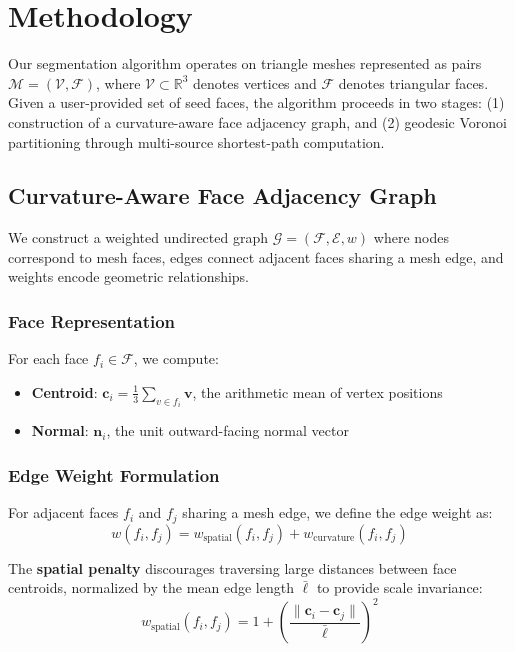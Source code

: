 \section{Methodology}
\label{sec:methodology}

Our segmentation algorithm operates on triangle meshes represented as pairs $\mathcal{M} = (\mathcal{V}, \mathcal{F})$, where $\mathcal{V} \subset \mathbb{R}^3$ denotes vertices and $\mathcal{F}$ denotes triangular faces. Given a user-provided set of seed faces, the algorithm proceeds in two stages: (1) construction of a curvature-aware face adjacency graph, and (2) geodesic Voronoi partitioning through multi-source shortest-path computation.

\subsection{Curvature-Aware Face Adjacency Graph}

We construct a weighted undirected graph $\mathcal{G} = (\mathcal{F}, \mathcal{E}, w)$ where nodes correspond to mesh faces, edges connect adjacent faces sharing a mesh edge, and weights encode geometric relationships.

\subsubsection{Face Representation}

For each face $f_i \in \mathcal{F}$, we compute:
\begin{itemize}
    \item \textbf{Centroid}: $\mathbf{c}_i = \frac{1}{3}\sum_{v \in f_i} \mathbf{v}$, the arithmetic mean of vertex positions
    \item \textbf{Normal}: $\mathbf{n}_i$, the unit outward-facing normal vector
\end{itemize}

\subsubsection{Edge Weight Formulation}

For adjacent faces $f_i$ and $f_j$ sharing a mesh edge, we define the edge weight as:
\begin{equation}
    w(f_i, f_j) = w_{\text{spatial}}(f_i, f_j) + w_{\text{curvature}}(f_i, f_j)
\end{equation}

The \textbf{spatial penalty} discourages traversing large distances between face centroids, normalized by the mean edge length $\bar{\ell}$ to provide scale invariance:
\begin{equation}
    w_{\text{spatial}}(f_i, f_j) = 1 + \left(\frac{\|\mathbf{c}_i - \mathbf{c}_j\|}{\bar{\ell}}\right)^2
\end{equation}

